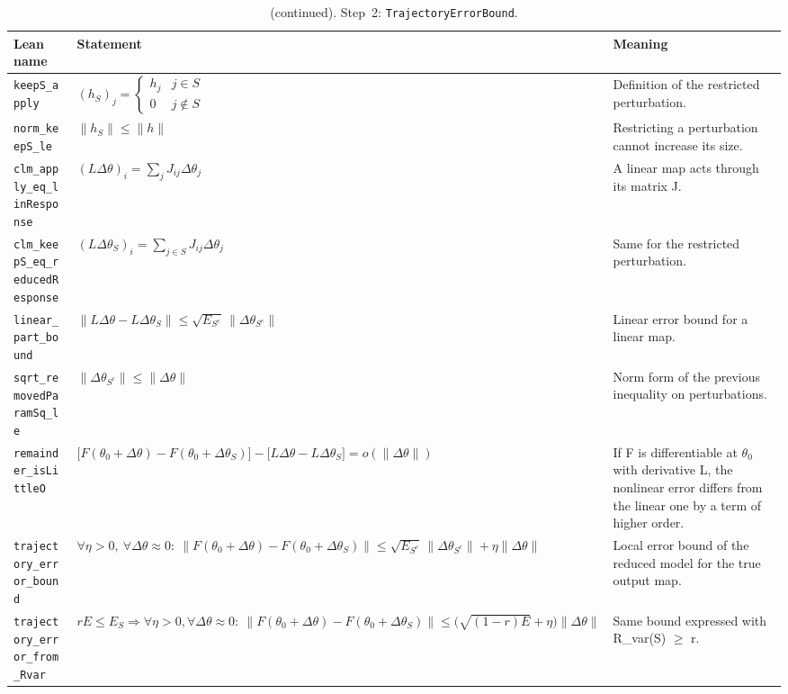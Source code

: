 \addtocounter{table}{-1}
{\small
\begin{longtable}{@{}>{\raggedright\arraybackslash}p{3.6cm}>{\raggedright\arraybackslash}p{6.6cm}>{\raggedright\arraybackslash}p{5.6cm}@{}}
\caption[]{(continued). Step~2: \texttt{TrajectoryErrorBound}.}\\
\toprule
Lean name & Statement & Meaning \\
\midrule
\endhead
\texttt{keepS\_\allowbreak{}apply} & $\displaystyle (h_S)_j=\begin{cases}h_j & j\in S\\ 0 & j\notin S\end{cases}$ & Definition of the restricted perturbation. \\[3pt]
\texttt{norm\_\allowbreak{}keepS\_\allowbreak{}le} & $\displaystyle \|h_S\|\le\|h\|$ & Restricting a perturbation cannot increase its size. \\[3pt]
\texttt{clm\_\allowbreak{}apply\_\allowbreak{}eq\_\allowbreak{}linResponse} & $\displaystyle (L\Delta\theta)_i=\sum_j J_{ij}\Delta\theta_j$ & A linear map acts through its matrix J. \\[3pt]
\texttt{clm\_\allowbreak{}keepS\_\allowbreak{}eq\_\allowbreak{}reducedResponse} & $\displaystyle (L\Delta\theta_S)_i=\sum_{j\in S}J_{ij}\Delta\theta_j$ & Same for the restricted perturbation. \\[3pt]
\texttt{linear\_\allowbreak{}part\_\allowbreak{}bound} & $\displaystyle \|L\Delta\theta-L\Delta\theta_S\|\le\sqrt{E_{S^c}}\,\|\Delta\theta_{S^c}\|$ & Linear error bound for a linear map. \\[3pt]
\texttt{sqrt\_\allowbreak{}removedParamSq\_\allowbreak{}le} & $\displaystyle \|\Delta\theta_{S^c}\|\le\|\Delta\theta\|$ & Norm form of the previous inequality on perturbations. \\[3pt]
\texttt{remainder\_\allowbreak{}isLittleO} & $\displaystyle \bigl[F(\theta_0{+}\Delta\theta)-F(\theta_0{+}\Delta\theta_S)\bigr]-\bigl[L\Delta\theta-L\Delta\theta_S\bigr]=o(\|\Delta\theta\|)$ & If F is differentiable at $\theta_0$ with derivative L, the nonlinear error differs from the linear one by a term of higher order. \\[3pt]
\texttt{trajectory\_\allowbreak{}error\_\allowbreak{}bound} & $\displaystyle \forall\eta>0,\ \forall\Delta\theta\approx 0:\ \|F(\theta_0{+}\Delta\theta)-F(\theta_0{+}\Delta\theta_S)\|\le\sqrt{E_{S^c}}\,\|\Delta\theta_{S^c}\|+\eta\|\Delta\theta\|$ & Local error bound of the reduced model for the true output map. \\[3pt]
\texttt{trajectory\_\allowbreak{}error\_\allowbreak{}from\_\allowbreak{}Rvar} & $\displaystyle rE\le E_S\Rightarrow\forall\eta>0,\forall\Delta\theta\approx0:\ \|F(\theta_0{+}\Delta\theta)-F(\theta_0{+}\Delta\theta_S)\|\le\bigl(\sqrt{(1-r)E}+\eta\bigr)\|\Delta\theta\|$ & Same bound expressed with R\_var(S) $\ge$ r. \\[3pt]
\bottomrule
\end{longtable}
}

